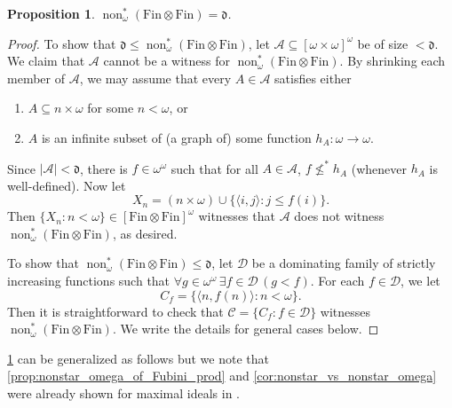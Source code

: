 \documentclass[a4paper,12pt]{amsart}
\newtheorem{prop}[thm]{Proposition}
\theoremstyle{definition}
\numberwithin{thm}{section}
\numberwithin{equation}{section}
\newcommand{\dd}{\mathfrak{d}}
\DeclareMathOperator{\non}{non}
\newcommand{\finfin}{\mathrm{Fin}\otimes\mathrm{Fin}}
\renewcommand{\subset}{\subseteq}
\begin{document}
    \begin{prop}\label{prop:finfin_d}
        $\non^*_\omega(\finfin) = \mathfrak{d}$.
    \end{prop}
    \begin{proof}
        To show that $\dd\leq\non^*_{\omega}(\finfin)$, let $\mathcal{A}\subset[\omega\times\omega]^\omega$ be of size $<\dd$. We claim that $\mathcal{A}$ cannot be a witness for $\non^*_\omega(\finfin)$. By shrinking each member of $\mathcal{A}$, we may assume that every $A\in\mathcal{A}$ satisfies either
        \begin{enumerate}
            \item $A\subset n\times\omega$ for some $n<\omega$, or
            \item $A$ is an infinite subset of (a graph of) some function $h_A\colon\omega\to\omega$.
        \end{enumerate}
        Since $\lvert\mathcal{A}\rvert<\dd$, there is $f\in\omega^\omega$ such that for all $A\in\mathcal{A}$, $f\not\leq^* h_A$ (whenever $h_A$ is well-defined). Now let
        \[
        X_n = (n\times\omega)\cup\{\langle i, j\rangle:j\leq f(i)\}.
        \]
        Then $\{X_n:n<\omega\}\in[\finfin]^\omega$ witnesses that $\mathcal{A}$ does not witness $\non^*_\omega(\finfin)$, as desired.
    
        To show that $\non^*_\omega(\finfin)\leq\dd$, let $\mathcal{D}$ be a dominating family of strictly increasing functions such that $\forall g\in\omega^\omega\,\exists f\in\mathcal{D}\,(g<f)$. For each $f\in\mathcal{D}$, we let
        \[
        C_f = \{\langle n, f(n)\rangle : n<\omega\}.
        \]
        Then it is straightforward to check that $\mathcal{C} = \{C_f: f\in\mathcal{D}\}$ witnesses $\non^*_\omega(\finfin)$. We write the details for general cases below.
    \end{proof}
    
    \cref{prop:finfin_d} can be generalized as follows 
    but we note that \cref{prop:nonstar_omega_of_Fubini_prod} and \cref{cor:nonstar_vs_nonstar_omega} were already shown for maximal ideals in \cite{BS99}.
    
\end{document}
